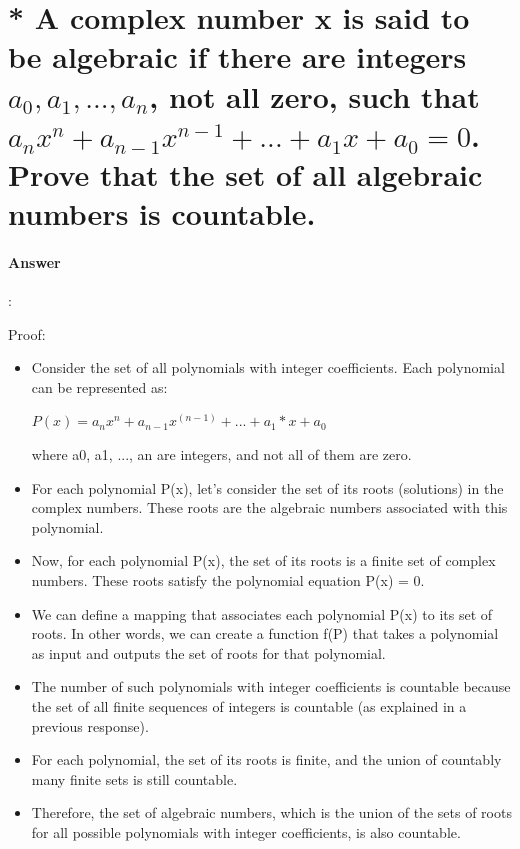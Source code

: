 \documentclass{article}
\begin{document}
\section{* A complex number x is said to be algebraic if there are integers $a_0, a_1, . . ., a_n$, not all zero, such that $a_nx^n + a_{n-1}x^{n-1} + ... + a_1x + a_0 = 0$. Prove that the set of all algebraic numbers is countable.}

\paragraph{Answer}:

Proof:

\begin{itemize}
  \item Consider the set of all polynomials with integer coefficients. Each polynomial can be represented as:

  $P(x) = a_nx^n + a_{n-1}x^(n-1) + ... + a_1*x + a_0$
  
  where a0, a1, ..., an are integers, and not all of them are zero.
  
  \item For each polynomial P(x), let's consider the set of its roots (solutions) in the complex numbers. These roots are the algebraic numbers associated with this polynomial.
  
  \item Now, for each polynomial P(x), the set of its roots is a finite set of complex numbers. These roots satisfy the polynomial equation P(x) = 0.
  
  \item We can define a mapping that associates each polynomial P(x) to its set of roots. In other words, we can create a function f(P) that takes a polynomial as input and outputs the set of roots for that polynomial.
  
  \item The number of such polynomials with integer coefficients is countable because the set of all finite sequences of integers is countable (as explained in a previous response).
  
  \item For each polynomial, the set of its roots is finite, and the union of countably many finite sets is still countable.
  
  \item Therefore, the set of algebraic numbers, which is the union of the sets of roots for all possible polynomials with integer coefficients, is also countable.
\end{itemize}
\end{document}
